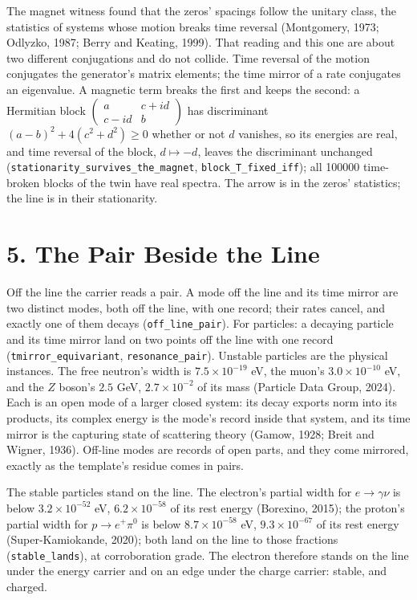 \documentclass[10pt]{article}
\begin{document}
The magnet witness found that the zeros' spacings follow the unitary
class, the statistics of systems whose motion breaks time reversal
(Montgomery, 1973; Odlyzko, 1987; Berry and Keating, 1999). That reading
and this one are about two different conjugations and do not collide.
Time reversal of the motion conjugates the generator's matrix elements;
the time mirror of a rate conjugates an eigenvalue. A magnetic term
breaks the first and keeps the second: a Hermitian block
\(\begin{pmatrix}a & c+id\\ c-id & b\end{pmatrix}\) has discriminant
\((a-b)^2+4(c^2+d^2)\ge0\) whether or not \(d\) vanishes, so its
energies are real, and time reversal of the block, \(d\mapsto -d\),
leaves the discriminant unchanged
(\texttt{stationarity\_survives\_the\_magnet},
\texttt{block\_T\_fixed\_iff}); all 100000 time-broken blocks of the
twin have real spectra. The arrow is in the zeros' statistics; the line
is in their stationarity.

\hypertarget{the-pair-beside-the-line}{%
\section{5. The Pair Beside the Line}\label{the-pair-beside-the-line}}

Off the line the carrier reads a pair. A mode off the line and its time
mirror are two distinct modes, both off the line, with one record; their
rates cancel, and exactly one of them decays (\texttt{off\_line\_pair}).
For particles: a decaying particle and its time mirror land on two
points off the line with one record (\texttt{tmirror\_equivariant},
\texttt{resonance\_pair}). Unstable particles are the physical
instances. The free neutron's width is \(7.5\times10^{-19}\) eV, the
muon's \(3.0\times10^{-10}\) eV, and the \(Z\) boson's \(2.5\) GeV,
\(2.7\times10^{-2}\) of its mass (Particle Data Group, 2024). Each is an
open mode of a larger closed system: its decay exports norm into its
products, its complex energy is the mode's record inside that system,
and its time mirror is the capturing state of scattering theory (Gamow,
1928; Breit and Wigner, 1936). Off-line modes are records of open parts,
and they come mirrored, exactly as the template's residue comes in
pairs.

The stable particles stand on the line. The electron's partial width for
\(e\to\gamma\nu\) is below \(3.2\times10^{-52}\) eV,
\(6.2\times10^{-58}\) of its rest energy (Borexino, 2015); the proton's
partial width for \(p\to e^+\pi^0\) is below \(8.7\times10^{-58}\) eV,
\(9.3\times10^{-67}\) of its rest energy (Super-Kamiokande, 2020); both
land on the line to those fractions (\texttt{stable\_lands}), at
corroboration grade. The electron therefore stands on the line under the
energy carrier and on an edge under the charge carrier: stable, and
charged.
\end{document}
